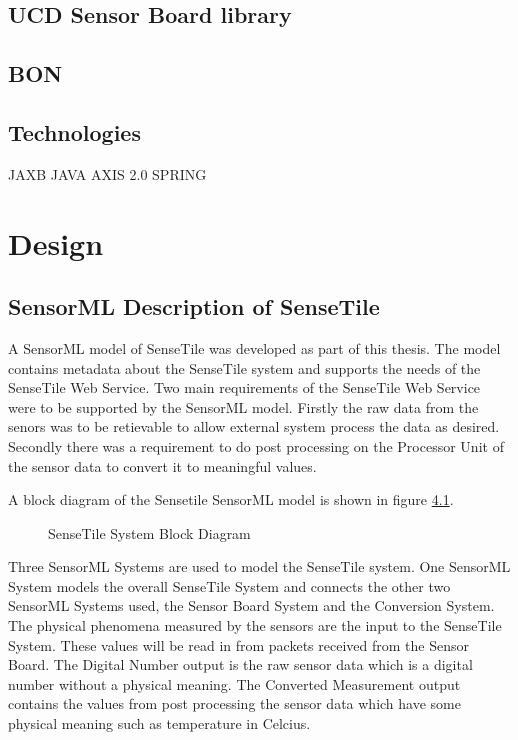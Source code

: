 \documentclass[]{final_report}
\begin{document}
\section{UCD Sensor Board library}
\section{BON}
\section{Technologies}
JAXB
JAVA
AXIS 2.0
SPRING

\chapter{Design}
\section{SensorML Description of SenseTile}

A SensorML model of SenseTile was developed as part of this thesis. The model contains metadata about the SenseTile system and supports the needs of the SenseTile Web Service. Two main requirements of the SenseTile Web Service were to be supported by the SensorML model. Firstly the raw data from the senors was to be retievable to allow external system process the data as desired. Secondly there was a requirement to do post processing on the Processor Unit of the sensor data to convert it to meaningful values.

A block diagram of the Sensetile SensorML model is shown in figure \ref{fig:SenseTileSystem}.
\begin{figure}[h]
\caption{SenseTile System Block Diagram}\label{fig:SenseTileSystem}
\end{figure}

Three SensorML Systems are used to model the SenseTile system. One SensorML System models the overall SenseTile System and connects the other two SensorML Systems used, the Sensor Board System and the Conversion System. The physical phenomena measured by the sensors are the input to the  SenseTile System. These values will be read in from packets received from the Sensor Board. The Digital Number output is the raw sensor data which is a digital number without a physical meaning. The Converted Measurement output contains the values from post processing the sensor data which have some physical meaning such as temperature in Celcius.
\end{document}
